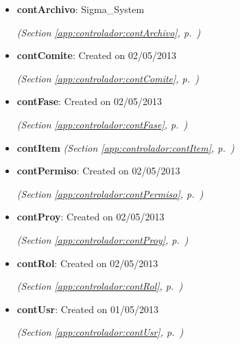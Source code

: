 \begin{itemize}
\setlength{\parskip}{0ex}
\item \textbf{contArchivo}: Sigma\_System



  \textit{(Section \ref{app:controlador:contArchivo}, p.~\pageref{app:controlador:contArchivo})}

\item \textbf{contComite}: Created on 02/05/2013



  \textit{(Section \ref{app:controlador:contComite}, p.~\pageref{app:controlador:contComite})}

\item \textbf{contFase}: Created on 02/05/2013



  \textit{(Section \ref{app:controlador:contFase}, p.~\pageref{app:controlador:contFase})}

\item \textbf{contItem}
  \textit{(Section \ref{app:controlador:contItem}, p.~\pageref{app:controlador:contItem})}

\item \textbf{contPermiso}: Created on 02/05/2013



  \textit{(Section \ref{app:controlador:contPermiso}, p.~\pageref{app:controlador:contPermiso})}

\item \textbf{contProy}: Created on 02/05/2013



  \textit{(Section \ref{app:controlador:contProy}, p.~\pageref{app:controlador:contProy})}

\item \textbf{contRol}: Created on 02/05/2013



  \textit{(Section \ref{app:controlador:contRol}, p.~\pageref{app:controlador:contRol})}

\item \textbf{contUsr}: Created on 01/05/2013



  \textit{(Section \ref{app:controlador:contUsr}, p.~\pageref{app:controlador:contUsr})}

\end{itemize}



